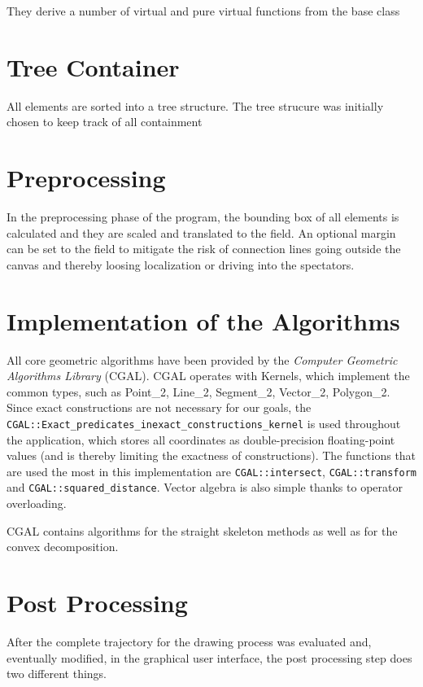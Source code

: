 They derive a number of virtual and pure virtual functions from the base class

\section{Tree Container}

All elements are sorted into a tree structure. The tree strucure was initially chosen to keep track of all containment 

\section{Preprocessing}

In the preprocessing phase of the program, the bounding box of all elements is calculated and they are scaled and translated to the field. An optional margin can be set to the field to mitigate the risk of connection lines going outside the canvas and thereby loosing localization or driving into the spectators.

\section{Implementation of the Algorithms}

All core geometric algorithms have been provided by the \textit{Computer Geometric Algorithms Library} (CGAL)\cite{cgal:eb-00a}. CGAL operates with Kernels, which implement the common types, such as Point\_2, Line\_2, Segment\_2, Vector\_2, Polygon\_2. Since exact constructions are not necessary for our goals, the \texttt{CGAL::Exact\_predicates\_inexact\_constructions\_kernel} is used throughout the application, which stores all coordinates as double-precision floating-point values (and is thereby limiting the exactness of constructions). The functions that are used the most in this implementation are \texttt{CGAL::intersect}, \texttt{CGAL::transform} and \texttt{CGAL::squared\_distance}. Vector algebra is also simple thanks to operator overloading.

CGAL contains algorithms for the straight skeleton methods\cite{cgal:c-sspo2-14a} as well as for the convex decomposition\cite{cgal:h-pp2-00a}.

\section{Post Processing}

After the complete trajectory for the drawing process was evaluated and, eventually modified, in the graphical user interface, the post processing step does two different things.

